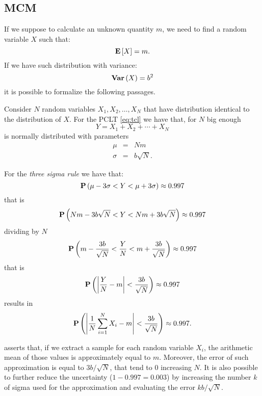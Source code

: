 \documentclass[dissertation.tex]{subfiles}
\begin{document}
\subsection{\acf{MCM}}
If we suppose to calculate an unknown quantity $m$, we need
to find a random variable $X$ such that:
\begin{equation*}
  \mathrm{\textbf{E}}\left[X\right] = m.
\end{equation*}
If we have such distribution with variance:
\begin{equation*}
  \mathrm{\textbf{Var}}\left(X\right) = b^2
\end{equation*}
it is possible to formalize the following passages.

Consider $N$ random variables $X_1,X_2,\dots,X_N$ that have
distribution identical to the distribution of $X$. For the \ac{PCLT}
\cref{eq:tcl} we have that, for $N$ big enough
\begin{equation*}
  Y=X_1+X_2+\cdots+X_N
\end{equation*}
is normally distributed with parameters
\begin{eqnarray*}
  \mu &=& Nm\\
  \sigma&=&b\sqrt{N}.
\end{eqnarray*}

For the \emph{three sigma rule} \cite{pukelsheim} we have that:
\begin{equation*}
  \mathrm{\textbf{P}}\left(\mu-3\sigma < Y <\mu +3\sigma\right)\approx 0.997
\end{equation*}
that is
\begin{equation*}
  \mathrm{\textbf{P}}\left(Nm-3b\sqrt{N} < Y < Nm+3b\sqrt{N}\right)\approx 0.997
\end{equation*}
dividing by $N$
\begin{equation*}
  \mathrm{\textbf{P}}\left(m-\frac{3b}{\sqrt{N}} < \frac{Y}{N} <
    m+\frac{3b}{\sqrt{N}}\right)\approx 0.997
\end{equation*}
that is
\begin{equation*}
  \mathrm{\textbf{P}}\left(\left|\frac{Y}{N}-m\right| <\frac{3b}{\sqrt{N}}\right)\approx 0.997
\end{equation*}
results in
\begin{equation}\label{eq:mc}
  \mathrm{\textbf{P}}\left(\left|\frac{1}{N}\sum_{i=1}^NX_i-m\right| <\frac{3b}{\sqrt{N}}\right)\approx 0.997.
\end{equation}

 asserts that, if we extract a sample for each random
variable $X_i$, the arithmetic mean of those values is approximately
equal to $m$. Moreover, the error of such approximation is equal to
$3b/\sqrt{N}$, that tend to $0$ increasing $N$. It is also possible to
further 
reduce the uncertainty ($1-0.997=0.003$) by increasing the number $k$ of
sigma used for the
approximation and evaluating the error $kb/\sqrt{N}$.
\end{document}

